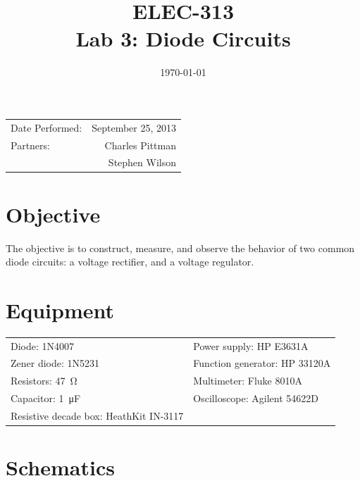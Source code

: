 \documentclass{article}
\author{}
\title{ELEC-313 \\ Lab 3: Diode Circuits\\ }
\date{\today}
\begin{document}
\maketitle

\begin{center}
  \begin{tabular}{lr}
    Date Performed: & September 25, 2013 \\
    Partners:       & Charles Pittman    \\
                    & Stephen Wilson     \\
  \end{tabular}
\end{center}

\newpage

\tableofcontents
\listoffigures
\listoftables

\newpage

\renewcommand{\labelenumi}{\alph{enumi}.}

\section{Objective}
\label{sec:objective}

The objective is to construct, measure, and observe the behavior of two common diode circuits: a voltage rectifier, and a voltage regulator.

\section{Equipment}
\label{sec:equipment}

\begin{tabular}{ll}
  \centering
  Diode: 1N4007                          & Power supply: HP E3631A       \\
  Zener diode: 1N5231                    & Function generator: HP 33120A \\
  Resistors: \SI{47}{\ohm}               & Multimeter: Fluke 8010A       \\
  Capacitor: \SI{1}{\micro\farad}        & Oscilloscope: Agilent 54622D  \\
  Resistive decade box: HeathKit IN-3117 &                               \\
\end{tabular}

\section{Schematics}
\label{sec:schematics}
\end{document}
